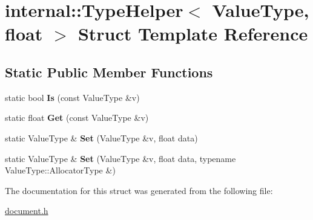 \hypertarget{a02052}{}\section{internal\+:\+:Type\+Helper$<$ Value\+Type, float $>$ Struct Template Reference}
\label{a02052}
\subsection*{Static Public Member Functions}
\begin{DoxyCompactItemize}
\item 
\mbox{\label{a02052_a1108488a02868bb91c3c14f4598bbebc}} 
static bool {\bfseries Is} (const Value\+Type \&v)
\item 
\mbox{\label{a02052_aa681e0d25878a7a770b0be82322b435a}} 
static float {\bfseries Get} (const Value\+Type \&v)
\item 
\mbox{\label{a02052_a28318c2063421cf18dfa23d16352a3b8}} 
static Value\+Type \& {\bfseries Set} (Value\+Type \&v, float data)
\item 
\mbox{\label{a02052_a3a0d8783f6228504058c427a16687bdf}} 
static Value\+Type \& {\bfseries Set} (Value\+Type \&v, float data, typename Value\+Type\+::\+Allocator\+Type \&)
\end{DoxyCompactItemize}


The documentation for this struct was generated from the following file\+:\begin{DoxyCompactItemize}
\item 
\hyperlink{a00476}{document.\+h}\end{DoxyCompactItemize}

